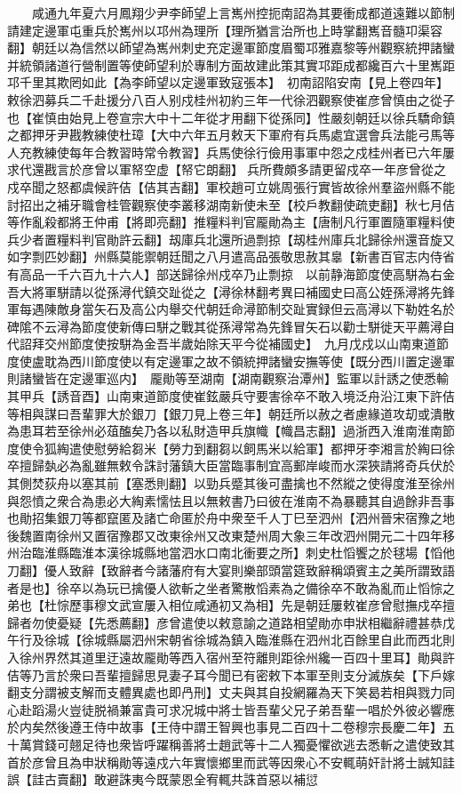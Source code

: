 　　咸通九年夏六月鳳翔少尹李師望上言嶲州控扼南詔為其要衝成都道遠難以節制請建定邊軍屯重兵於嶲州以邛州為理所【理所猶言治所也上時掌翻嶲音髓卭渠容翻】朝廷以為信然以師望為嶲州刺史充定邊軍節度眉蜀邛雅嘉黎等州觀察統押諸蠻并統領諸道行營制置等使師望利於專制方面故建此策其實邛距成都纔百六十里嶲距邛千里其欺罔如此【為李師望以定邊軍致寇張本】　初南詔陷安南【見上卷四年】敕徐泗募兵二千赴援分八百人别戍桂州初約三年一代徐泗觀察使崔彦曾慎由之從子也【崔慎由始見上卷宣宗大中十二年從才用翻下從孫同】性嚴刻朝廷以徐兵驕命鎮之都押牙尹戡教練使杜璋【大中六年五月敕天下軍府有兵馬處宜選會兵法能弓馬等人充教練使每年合教習時常令教習】兵馬使徐行儉用事軍中怨之戍桂州者已六年屢求代還戡言於彦曾以軍帑空虚【帑它朗翻】兵所費頗多請更留戍卒一年彦曾從之戍卒聞之怒都虞候許佶【佶其吉翻】軍校趙可立姚周張行實皆故徐州羣盜州縣不能討招出之補牙職會桂管觀察使李叢移湖南新使未至【校戶教翻使疏吏翻】秋七月佶等作亂殺都將王仲甫【將即亮翻】推糧料判官龎勛為主【唐制凡行軍置隨軍糧料使兵少者置糧料判官勛許云翻】刼庫兵北還所過剽掠【刼桂州庫兵北歸徐州還音旋又如字剽匹妙翻】州縣莫能禦朝廷聞之八月遣高品張敬思赦其辠【新書百官志内侍省有高品一千六百九十六人】部送歸徐州戍卒乃止剽掠　以前静海節度使高駢為右金吾大將軍駢請以從孫潯代鎮交趾從之【潯徐林翻考異曰補國史曰高公姪孫潯將先鋒軍每遇陳敵身當矢石及高公内舉交代朝廷命潯節制交趾實録但云高潯以下勒姓名於碑隂不云潯為節度使新傳曰駢之戰其從孫潯常為先鋒冒矢石以勸士駢徙天平薦潯自代詔拜交州節度使按駢為金吾半歲始除天平今從補國史】　九月戊戍以山南東道節度使盧耽為西川節度使以有定邊軍之故不領統押諸蠻安撫等使【既分西川置定邊軍則諸蠻皆在定邊軍巡内】　龎勛等至湖南【湖南觀察治潭州】監軍以計誘之使悉輸其甲兵【誘音酉】山南東道節度使崔鉉嚴兵守要害徐卒不敢入境泛舟沿江東下許佶等相與謀曰吾輩罪大於銀刀【銀刀見上卷三年】朝廷所以赦之者慮緣道攻刧或潰散為患耳若至徐州必葅醢矣乃各以私財造甲兵旗幟【幟昌志翻】過浙西入淮南淮南節度使令狐綯遣使慰勞給芻米【勞力到翻芻以飼馬米以給軍】都押牙李湘言於綯曰徐卒擅歸埶必為亂雖無敕令誅討藩鎮大臣當臨事制宜高郵岸峻而水深狹請將奇兵伏於其側焚荻舟以塞其前【塞悉則翻】以勁兵蹙其後可盡擒也不然縱之使得度淮至徐州與怨憤之衆合為患必大綯素懦怯且以無敕書乃曰彼在淮南不為暴聽其自過餘非吾事也勛招集銀刀等都竄匿及諸亡命匿於舟中衆至千人丁巳至泗州【泗州晉宋宿豫之地後魏置南徐州又置宿豫郡又改東徐州又改東楚州周大象三年改泗州開元二十四年移州治臨淮縣臨淮本漢徐城縣地當泗水口南北衝要之所】刺史杜慆饗之於毬場【慆他刀翻】優人致辭【致辭者今諸藩府有大宴則樂部頭當筵致辭稱頌賓主之美所謂致語者是也】徐卒以為玩已擒優人欲斬之坐者驚散慆素為之備徐卒不敢為亂而止慆悰之弟也【杜悰歷事穆文武宣屢入相位咸通初又為相】先是朝廷屢敕崔彦曾慰撫戍卒擅歸者勿使憂疑【先悉薦翻】彦曾遣使以敕意諭之道路相望勛亦申狀相繼辭禮甚恭戊午行及徐城【徐城縣屬泗州宋朝省徐城為鎮入臨淮縣在泗州北百餘里自此而西北則入徐州界然其道里迂遠故龎勛等西入宿州至符離則距徐州纔一百四十里耳】勛與許佶等乃言於衆曰吾輩擅歸思見妻子耳今聞已有密敕下本軍至則支分滅族矣【下戶嫁翻支分謂被支解而支體異處也即冎刑】丈夫與其自投網羅為天下笑曷若相與戮力同心赴蹈湯火豈徒脱禍兼富貴可求况城中將士皆吾輩父兄子弟吾輩一唱於外彼必響應於内矣然後遵王侍中故事【王侍中謂王智興也事見二百四十二卷穆宗長慶二年】五十萬賞錢可翹足待也衆皆呼躍稱善將士趙武等十二人獨憂懼欲逃去悉斬之遣使致其首於彦曾且為申狀稱勛等遠戍六年實懷鄉里而武等因衆心不安輒萌奸計將士誠知詿誤【詿古賣翻】敢避誅夷今既蒙恩全宥輒共誅首惡以補愆